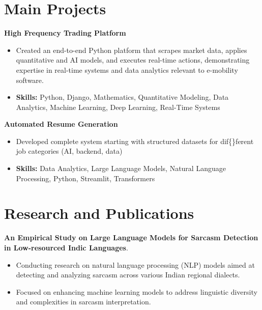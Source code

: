 \documentclass[a4paper,11pt]{article}
\begin{document}
\section{\textbf{Main Projects}}

\vspace{1mm}
  \textbf{High Frequency Trading Platform  }
\vspace{-1.5mm} %
\begin{itemize}
  \item Created an end-to-end Python platform that scrapes market data, applies quantitative and AI models, and executes real-time actions, demonstrating expertise in real-time systems and data analytics relevant to e-mobility software.
\vspace{-3mm}
  \item \textbf{Skills:} Python, Django, Mathematics, Quantitative Modeling, Data Analytics, Machine Learning, Deep Learning, Real-Time Systems
\end{itemize}


\vspace{1mm}
   \textbf{Automated Resume Generation }
\vspace{-1.5mm} %
\begin{itemize}
  \item Developed complete system starting with structured datasets for dif\{\}ferent job categories (AI, backend, data)
\vspace{-3mm}
  \item \textbf{Skills:} Data Analytics, Large Language Models, Natural Language Processing, Python, Streamlit, Transformers
\end{itemize}



\section{\textbf{Research and Publications} \hfill }
\vspace{1mm}
  \textbf{An Empirical Study on Large Language Models for Sarcasm Detection in Low-resourced Indic Languages}.
\vspace{-1mm} %
\begin{itemize}
  \item Conducting research on natural language processing (NLP) models aimed at detecting and analyzing sarcasm across various Indian regional dialects.
\vspace{-3mm}
  \item Focused on enhancing machine learning models to address linguistic diversity and complexities in sarcasm interpretation.
\end{itemize}
\end{document}
